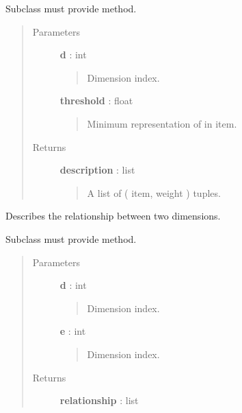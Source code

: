 \documentclass[letterpaper,10pt,english]{sphinxmanual}
\begin{document}
\begin{fulllineitems}
\begin{fulllineitems}
Subclass must provide  method.
\begin{quote}\begin{description}
\item[{Parameters}] \leavevmode
\textbf{d} : int
\begin{quote}

Dimension index.
\end{quote}

\textbf{threshold} : float
\begin{quote}

Minimum representation of  in item.
\end{quote}

\item[{Returns}] \leavevmode
\textbf{description} : list
\begin{quote}

A list of ( item, weight ) tuples.
\end{quote}

\end{description}\end{quote}

\end{fulllineitems}


\begin{fulllineitems}
\label{tethne.model.corpus.dtmmodel:tethne.model.corpus.dtmmodel.DTMModel.dimension_relationship}
Describes the relationship between two dimensions.

Subclass must provide  method.
\begin{quote}\begin{description}
\item[{Parameters}] \leavevmode
\textbf{d} : int
\begin{quote}

Dimension index.
\end{quote}

\textbf{e} : int
\begin{quote}

Dimension index.
\end{quote}

\item[{Returns}] \leavevmode
\textbf{relationship} : list
\begin{quote}


\end{quote}
\end{description}
\end{quote}
\end{fulllineitems}
\end{fulllineitems}
\end{document}

